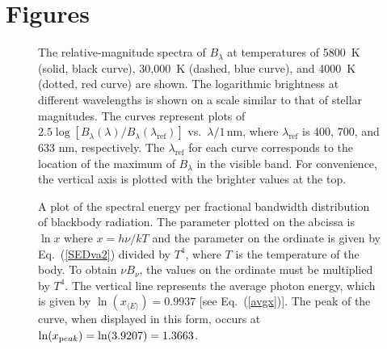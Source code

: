 \documentclass[12pt,aps,prb,preprint]{revtex4}   %
\begin{document}
\newpage
\section*{Figures}

\begin{figure}[h]
\caption{\label{ThreeStarsB} The relative-magnitude spectra of $B_\lambda$ at temperatures of 5800~K (solid, black curve), 30,000~K (dashed, blue curve), and 4000~K (dotted, red curve) are shown.  The logarithmic brightness at different wavelengths is shown on a scale similar to that of stellar magnitudes.   The curves represent plots of 
$2.5 \log[{B_\lambda(\lambda) / B_\lambda(\lambda_{\textrm{ref}})}]$ vs.\ $\lambda / 1\,\textrm{nm}$, where $\lambda_{\textrm{ref}}$ is 400, 700, and 633 nm, respectively.  The $\lambda_{\textrm{ref}}$ for each curve corresponds to the location of the maximum of $B_\lambda$ in the visible band. 
For convenience, the vertical axis is plotted with the brighter values at the top.}
\end{figure}

\begin{figure}[h]
\caption{A plot of the spectral energy per fractional bandwidth distribution of blackbody radiation.  The parameter plotted on the abcissa is $\ln x$ where $x = h \nu / kT$ and the parameter on the ordinate is given by Eq.~(\ref{SEDva2}) divided by $T^4$, where $T$ is the temperature of the body.  To obtain $\nu B_\nu$, 
the values on the ordinate must be multiplied by $T^4$.  The vertical line represents the average photon energy, which is given by 
$\ln (x_{\langle E\rangle}) = 0.9937$ [see Eq.~(\ref{avgx})].  The peak of the curve, when displayed in this form, occurs at $\ln (x_{\textrm peak}) = \ln(3.9207) = 1.3663$.}
\label{SEDplot}
\end{figure}
\end{document}
